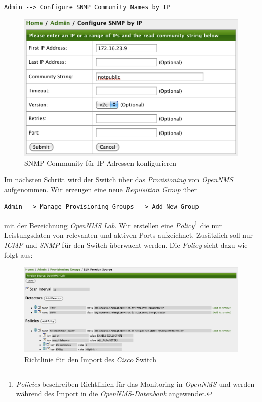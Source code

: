 \begin{lstlisting}[numbers=none]
Admin --> Configure SNMP Community Names by IP
\end{lstlisting}

\begin{figure}[H]
	\centering
	\includegraphics[width=1.0\textwidth]{images/use-cases/monitoring-layer-2/configure-snmp-by-ip}
	\caption{SNMP Community für IP-Adressen konfigurieren}
	\label{pic:configure-snmp-by-ip}
\end{figure}

Im nächsten Schritt wird der Switch über das \emph{Provisioning} von \emph{OpenNMS} aufgenommen. Wir erzeugen eine neue \emph{Requisition Group} über 

\begin{lstlisting}[numbers=none]
Admin --> Manage Provisioning Groups --> Add New Group
\end{lstlisting}

mit der Bezeichnung \emph{OpenNMS Lab}. Wir erstellen eine \emph{Policy}\footnote{\emph{Policies} beschreiben Richtlinien für das Monitoring in \emph{OpenNMS} und werden während des Import in die \emph{OpenNMS-Datenbank} angewendet.} die nur Leistungsdaten von relevanten und aktiven Ports aufzeichnet. Zusätzlich soll nur \emph{ICMP} und \emph{SNMP} für den Switch überwacht werden. Die \emph{Policy} sieht dazu wie folgt aus:

\begin{figure}[H]
	\centering
	\includegraphics[width=1.0\textwidth]{images/use-cases/monitoring-layer-2/requisition-policy}
	\caption{Richtlinie für den Import des \emph{Cisco} Switch}
	\label{pic:requisition-policy}
\end{figure}

